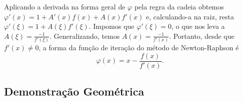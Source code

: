 Aplicando a derivada na forma geral de $\varphi$ pela regra da cadeia obtemos $\varphi'(x) = 1 + A'(x)f(x) + A(x)f'(x)$ e, calculando-a na raiz, resta $\varphi'(\xi) = 1 + A(\xi)f'(\xi)$. Impomos que $\varphi'(\xi) = 0$, o que nos leva a $A(\xi) = \frac{-1}{f'(\xi)}$. Generalizando, temos $A(x) = \frac{-1}{f'(x)}$. Portanto, desde que $f'(x) \neq 0$, a forma da função de iteração do método de Newton-Raphson é 
\begin{equation*}
    \varphi(x) = x - \frac{f(x)}{f'(x)}.
\end{equation*}

\subsection{Demonstração Geométrica}
